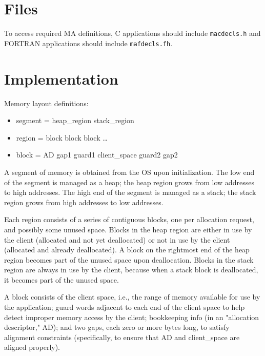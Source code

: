 \section{Files}

To access required MA definitions, C applications should include
{\tt macdecls.h} and FORTRAN applications should include
{\tt mafdecls.fh}.

\section{Implementation}

Memory layout definitions:
\begin{itemize}
\item segment = heap\_region stack\_region
\item region = block block block \ldots
\item block = AD gap1 guard1 client\_space guard2 gap2
\end{itemize}

A segment of memory is obtained from the OS upon initialization.  The
low end of the segment is managed as a heap; the heap region grows
from low addresses to high addresses.  The high end of the segment is
managed as a stack; the stack region grows from high addresses to low
addresses.

Each region consists of a series of contiguous blocks, one per
allocation request, and possibly some unused space.  Blocks in the
heap region are either in use by the client (allocated and not yet
deallocated) or not in use by the client (allocated and already
deallocated).  A block on the rightmost end of the heap region becomes
part of the unused space upon deallocation.  Blocks in the stack
region are always in use by the client, because when a stack block is
deallocated, it becomes part of the unused space.

A block consists of the client space, i.e., the range of memory
available for use by the application; guard words adjacent to each end
of the client space to help detect improper memory access by the
client; bookkeeping info (in an "allocation descriptor," AD); and two
gaps, each zero or more bytes long, to satisfy alignment constraints
(specifically, to ensure that AD and client\_space are aligned
properly).  


